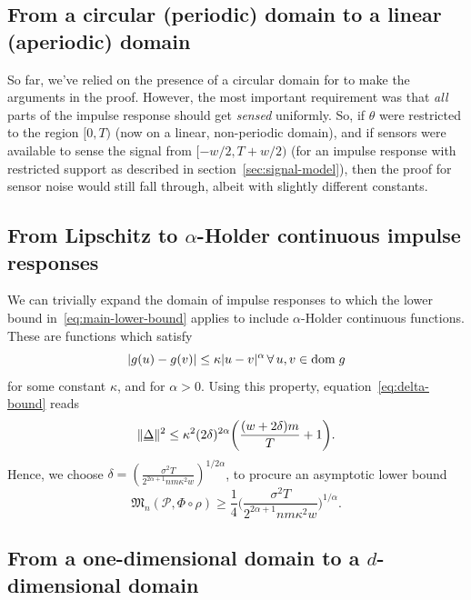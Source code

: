 \documentclass[conference]{IEEEtran}
\providecommand{\v}{}
\renewcommand{\v}[1]{\underline{#1}}
\DeclarePairedDelimiter\abs{\lvert}{\rvert}
\DeclarePairedDelimiter\norm{\lVert}{\rVert}
\newcommand{\Phiorho}{\Phi\!\circ\!\rho}
\begin{document}
\subsection{From a circular (periodic) domain to a linear (aperiodic) domain}

So far, we've relied on the presence of a circular domain for to make the
arguments in the proof. However, the most important requirement was that
\emph{all} parts of the impulse response should get \emph{sensed} uniformly.
So, if $\theta$ were restricted to the region $[0, T)$ (now on a linear,
non-periodic domain), and if sensors were available to sense the signal from
$[-w/2, T{+}w/2)$ (for an impulse response with restricted support as described
in section~\ref{sec:signal-model}), then the proof for sensor noise would still
fall through, albeit with slightly different constants.

\subsection{From Lipschitz to $\alpha$-Holder continuous impulse responses}

We can trivially expand the domain of impulse responses to which the lower
bound in~\eqref{eq:main-lower-bound} applies to include $\alpha$-Holder
continuous functions. These are functions which satisfy
\begin{equation}
	\abs{g(u) - g(v)} \leq \kappa \abs{u - v}^\alpha \, \forall \, u, v \in \text{dom} \; g
\end{equation}
for some constant $\kappa$, and for $\alpha > 0$. Using this property,
equation~\eqref{eq:delta-bound} reads
\begin{equation} \label{eq:holder-delta-bound}
	\norm{\v\Delta}^2 \leq \kappa^2 (2 \delta)^{2\alpha} \bigg(\frac{(w + 2\delta) m}{T} + 1\bigg).
\end{equation}
Hence, we choose $\delta = (\frac{\sigma^2 T}{2^{2\alpha + 1} nm \kappa^2
w})^{1/2\alpha}$, to procure an asymptotic lower bound
\begin{equation}
	\mathfrak{M}_n(\mathcal{P}, \Phiorho) \geq \frac{1}{4} \bigg(\frac{\sigma^2 T}{2^{2\alpha + 1} nm \kappa^2
w}\bigg)^{1/\alpha}.
\end{equation}

\subsection{From a one-dimensional domain to a $d$-dimensional domain}
\end{document}
